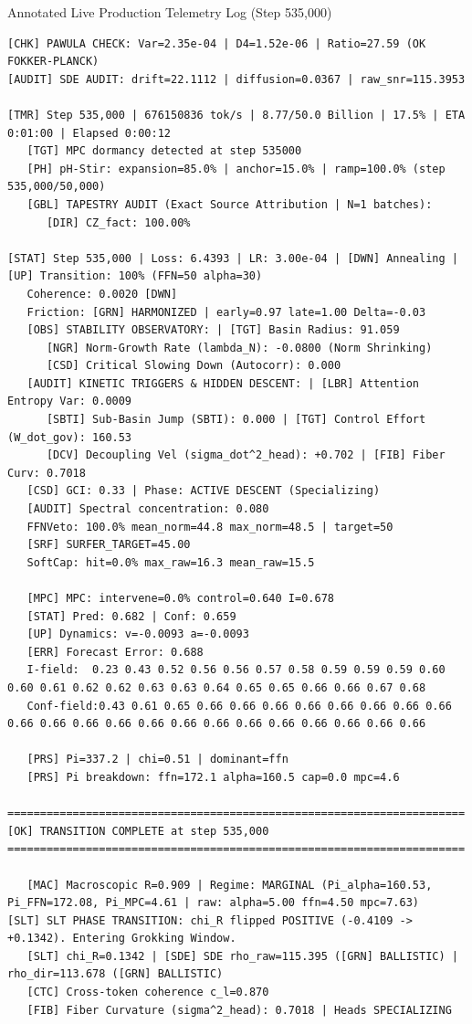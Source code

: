 \documentclass[11pt,a4paper]{article}
\begin{document}
\begin{logbox}{Annotated Live Production Telemetry Log (Step 535,000)}
\footnotesize
\begin{Verbatim}[breaklines=true,breakanywhere=true,breaksymbolleft={},breaksymbolright={}]
[CHK] PAWULA CHECK: Var=2.35e-04 | D4=1.52e-06 | Ratio=27.59 (OK FOKKER-PLANCK)
[AUDIT] SDE AUDIT: drift=22.1112 | diffusion=0.0367 | raw_snr=115.3953

[TMR] Step 535,000 | 676150836 tok/s | 8.77/50.0 Billion | 17.5% | ETA 0:01:00 | Elapsed 0:00:12
   [TGT] MPC dormancy detected at step 535000
   [PH] pH-Stir: expansion=85.0% | anchor=15.0% | ramp=100.0% (step 535,000/50,000)
   [GBL] TAPESTRY AUDIT (Exact Source Attribution | N=1 batches):
      [DIR] CZ_fact: 100.00%

[STAT] Step 535,000 | Loss: 6.4393 | LR: 3.00e-04 | [DWN] Annealing | [UP] Transition: 100% (FFN=50 alpha=30)
   Coherence: 0.0020 [DWN]
   Friction: [GRN] HARMONIZED | early=0.97 late=1.00 Delta=-0.03
   [OBS] STABILITY OBSERVATORY: | [TGT] Basin Radius: 91.059
      [NGR] Norm-Growth Rate (lambda_N): -0.0800 (Norm Shrinking)
      [CSD] Critical Slowing Down (Autocorr): 0.000
   [AUDIT] KINETIC TRIGGERS & HIDDEN DESCENT: | [LBR] Attention Entropy Var: 0.0009
      [SBTI] Sub-Basin Jump (SBTI): 0.000 | [TGT] Control Effort (W_dot_gov): 160.53
      [DCV] Decoupling Vel (sigma_dot^2_head): +0.702 | [FIB] Fiber Curv: 0.7018
   [CSD] GCI: 0.33 | Phase: ACTIVE DESCENT (Specializing)
   [AUDIT] Spectral concentration: 0.080
   FFNVeto: 100.0% mean_norm=44.8 max_norm=48.5 | target=50
   [SRF] SURFER_TARGET=45.00
   SoftCap: hit=0.0% max_raw=16.3 mean_raw=15.5

   [MPC] MPC: intervene=0.0% control=0.640 I=0.678
   [STAT] Pred: 0.682 | Conf: 0.659
   [UP] Dynamics: v=-0.0093 a=-0.0093
   [ERR] Forecast Error: 0.688
   I-field:  0.23 0.43 0.52 0.56 0.56 0.57 0.58 0.59 0.59 0.59 0.60 0.60 0.61 0.62 0.62 0.63 0.63 0.64 0.65 0.65 0.66 0.66 0.67 0.68
   Conf-field:0.43 0.61 0.65 0.66 0.66 0.66 0.66 0.66 0.66 0.66 0.66 0.66 0.66 0.66 0.66 0.66 0.66 0.66 0.66 0.66 0.66 0.66 0.66 0.66

   [PRS] Pi=337.2 | chi=0.51 | dominant=ffn
   [PRS] Pi breakdown: ffn=172.1 alpha=160.5 cap=0.0 mpc=4.6

======================================================================
[OK] TRANSITION COMPLETE at step 535,000
======================================================================

   [MAC] Macroscopic R=0.909 | Regime: MARGINAL (Pi_alpha=160.53, Pi_FFN=172.08, Pi_MPC=4.61 | raw: alpha=5.00 ffn=4.50 mpc=7.63)
[SLT] SLT PHASE TRANSITION: chi_R flipped POSITIVE (-0.4109 -> +0.1342). Entering Grokking Window.
   [SLT] chi_R=0.1342 | [SDE] SDE rho_raw=115.395 ([GRN] BALLISTIC) | rho_dir=113.678 ([GRN] BALLISTIC)
   [CTC] Cross-token coherence c_l=0.870
   [FIB] Fiber Curvature (sigma^2_head): 0.7018 | Heads SPECIALIZING


\end{Verbatim}
\end{logbox}
\end{document}
